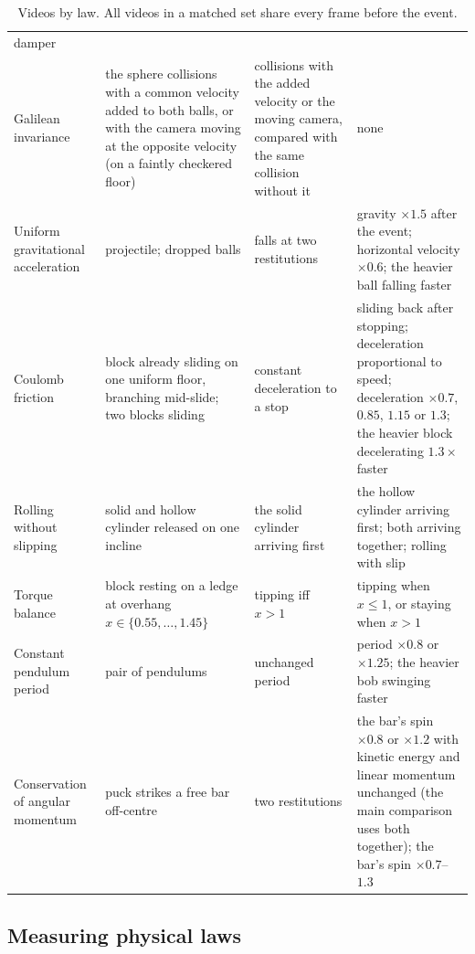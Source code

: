 \documentclass[10pt]{article}
\begin{document}
\begin{table}[h]
\begin{tabularx}{\linewidth}{@{}>{\raggedright\arraybackslash}p{1.9cm}>{\raggedright\arraybackslash}p{3.3cm}>{\raggedright\arraybackslash}X>{\raggedright\arraybackslash}X@{}}
damper \\
Galilean invariance & the sphere collisions with a common velocity added to both balls, or with the camera moving at the
opposite velocity (on a faintly checkered floor) & collisions with the added velocity or the moving camera, compared
with the same collision without it & none \\
Uniform gravitational acceleration & projectile; dropped balls & falls at two restitutions & gravity $\times1.5$ after the event; horizontal
velocity $\times0.6$; the heavier ball falling faster \\
Coulomb friction & block already sliding on one uniform floor, branching mid-slide; two blocks sliding & constant
deceleration to a stop & sliding back after stopping; deceleration proportional to speed; deceleration
$\times0.7$, $0.85$, $1.15$ or $1.3$; the heavier block decelerating $1.3\times$ faster \\
Rolling without slipping & solid and hollow cylinder released on one incline & the solid cylinder arriving first & the hollow cylinder
arriving first; both arriving together; rolling with slip \\
Torque balance & block resting on a ledge at overhang $x\in\{0.55,\dots,1.45\}$ & tipping iff $x>1$ & tipping when
$x\le1$, or staying when $x>1$ \\
Constant pendulum period & pair of pendulums & unchanged period & period $\times0.8$ or $\times1.25$; the heavier bob swinging
faster \\
Conservation of angular momentum & puck strikes a free bar off-centre & two restitutions & the bar's spin $\times0.8$ or $\times1.2$ with kinetic energy and linear momentum unchanged (the main
comparison uses both together); the bar's spin $\times0.7$--$1.3$ \\
\bottomrule
\end{tabularx}
\caption{Videos by law. All videos in a matched set share every frame before the event.}
\label{tab:videos}
\end{table}

\subsection{Measuring physical laws}
\label{sec:laws}
\end{document}
